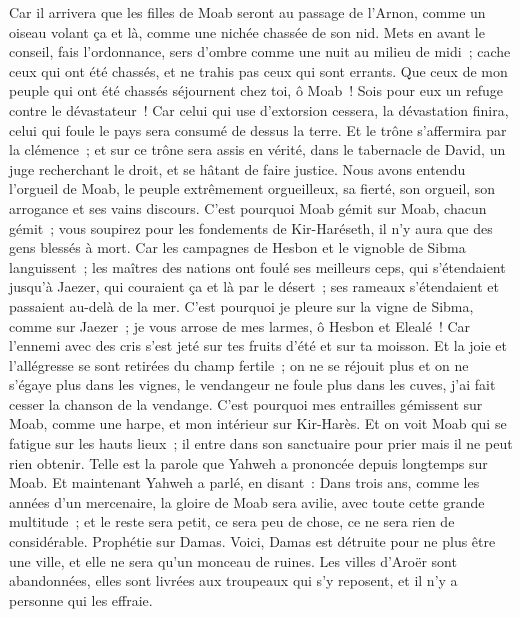 \begin{multicols}{2}
Car il arrivera que les filles de Moab seront au passage de l'Arnon, comme un oiseau volant ça et là, comme une nichée chassée de son nid.
Mets en avant le conseil, fais l'ordonnance, sers d'ombre comme une nuit au milieu de midi~; cache ceux qui ont été chassés, et ne trahis pas ceux qui sont errants.
Que ceux de mon peuple qui ont été chassés séjournent chez toi, ô Moab~! Sois pour eux un refuge contre le dévastateur~! Car celui qui use d'extorsion cessera, la dévastation finira, celui qui foule le pays sera consumé de dessus la terre.
Et le trône s'affermira par la clémence~; et sur ce trône sera assis en vérité, dans le tabernacle de David, un juge recherchant le droit, et se hâtant de faire justice.
Nous avons entendu l'orgueil de Moab, le peuple extrêmement orgueilleux, sa fierté, son orgueil, son arrogance et ses vains discours.
C'est pourquoi Moab gémit sur Moab, chacun gémit~; vous soupirez pour les fondements de Kir-Haréseth, il n'y aura que des gens blessés à mort.
Car les campagnes de Hesbon et le vignoble de Sibma languissent~; les maîtres des nations ont foulé ses meilleurs ceps, qui s'étendaient jusqu'à Jaezer, qui couraient ça et là par le désert~; ses rameaux s'étendaient et passaient au-delà de la mer.
C'est pourquoi je pleure sur la vigne de Sibma, comme sur Jaezer~; je vous arrose de mes larmes, ô Hesbon et Elealé~! Car l'ennemi avec des cris s'est jeté sur tes fruits d'été et sur ta moisson.
Et la joie et l'allégresse se sont retirées du champ fertile~; on ne se réjouit plus et on ne s'égaye plus dans les vignes, le vendangeur ne foule plus dans les cuves, j'ai fait cesser la chanson de la vendange.
C'est pourquoi mes entrailles gémissent sur Moab, comme une harpe, et mon intérieur sur Kir-Harès.
Et on voit Moab qui se fatigue sur les hauts lieux~; il entre dans son sanctuaire pour prier mais il ne peut rien obtenir.
Telle est la parole que Yahweh a prononcée depuis longtemps sur Moab.
Et maintenant Yahweh a parlé, en disant~: Dans trois ans, comme les années d'un mercenaire, la gloire de Moab sera avilie, avec toute cette grande multitude~; et le reste sera petit, ce sera peu de chose, ce ne sera rien de considérable.
\VerseOne{}Prophétie sur Damas. Voici, Damas est détruite pour ne plus être une ville, et elle ne sera qu'un monceau de ruines.
Les villes d'Aroër sont abandonnées, elles sont livrées aux troupeaux qui s'y reposent, et il n'y a personne qui les effraie.

\end{multicols}
